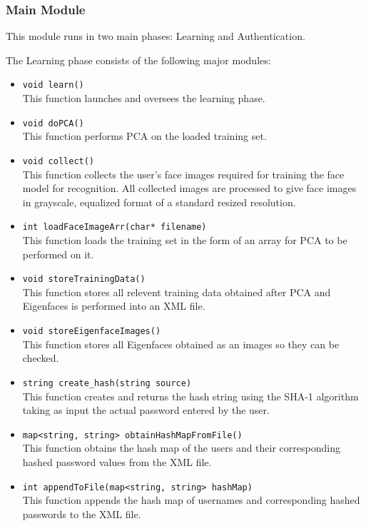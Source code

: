 \documentclass[12pt]{article}			%
\begin{document}
\subsubsection { Main Module }
This module runs in two main phases: Learning and Authentication.

The Learning phase consists of the following major modules:
\begin{itemize}
\item 
\verb+void learn()+\\
This function launches and oversees the learning phase.

\item 
\verb+void doPCA()+\\
This function performs PCA on the loaded training set.

\item 
\verb+void collect()+\\
This function collects the user's face images required for training the face model for recognition. All collected images are processed to give face images in grayscale, equalized format of a standard resized resolution. 

\item 
\verb+int loadFaceImageArr(char* filename)+\\
This function loads the training set in the form of an array for PCA to be performed on it.

\item 
\verb+void storeTrainingData()+\\
This function stores all relevent training data obtained after PCA and Eigenfaces is performed into an XML file.

\item 
\verb+void storeEigenfaceImages()+\\
This function stores all Eigenfaces obtained as an images so they can be checked.

\item 
\verb+string create_hash(string source)+\\
This function creates and returns the hash string using the SHA-1 algorithm taking as input the actual password entered by the user.

\item 
\verb+map<string, string> obtainHashMapFromFile()+\\
This function obtains the hash map of the users and their corresponding hashed password values from the XML file.

\item 
\verb+int appendToFile(map<string, string> hashMap)+\\
This function appends the hash map of usernames and corresponding hashed passwords to the XML file.

\end{itemize}
\end{document}
